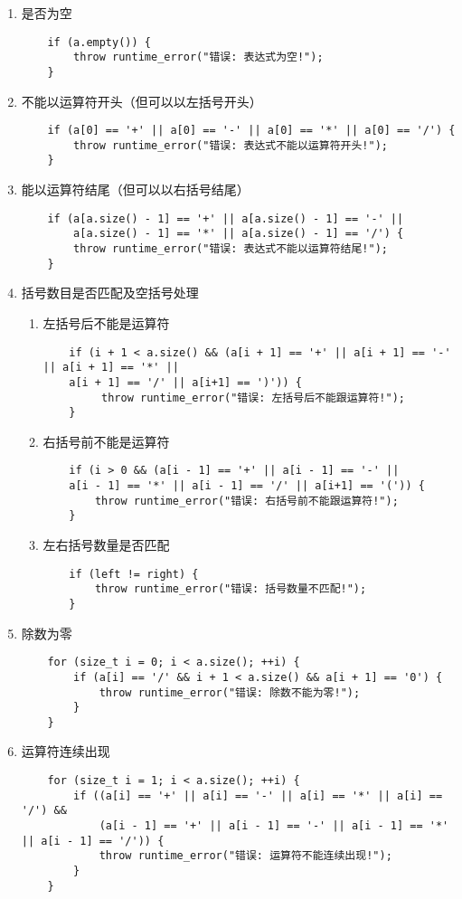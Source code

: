 \documentclass[a4paper]{article}
\begin{document}
\begin{enumerate}
    \item 是否为空
    \begin{lstlisting}
    if (a.empty()) {
        throw runtime_error("错误: 表达式为空!");
    }
    \end{lstlisting}
    \item 不能以运算符开头（但可以以左括号开头）
    \begin{lstlisting}
    if (a[0] == '+' || a[0] == '-' || a[0] == '*' || a[0] == '/') {
        throw runtime_error("错误: 表达式不能以运算符开头!");
    }
    \end{lstlisting}
    \item 能以运算符结尾（但可以以右括号结尾）
    \begin{lstlisting}
    if (a[a.size() - 1] == '+' || a[a.size() - 1] == '-' || 
        a[a.size() - 1] == '*' || a[a.size() - 1] == '/') {
        throw runtime_error("错误: 表达式不能以运算符结尾!");
    }

    \end{lstlisting}
    \item 括号数目是否匹配及空括号处理
    \begin{enumerate}
        \item 左括号后不能是运算符
        \begin{lstlisting}
    if (i + 1 < a.size() && (a[i + 1] == '+' || a[i + 1] == '-' || a[i + 1] == '*' || 
    a[i + 1] == '/' || a[i+1] == ')')) {
         throw runtime_error("错误: 左括号后不能跟运算符!");
    }
        \end{lstlisting}
        \item 右括号前不能是运算符
        \begin{lstlisting}
    if (i > 0 && (a[i - 1] == '+' || a[i - 1] == '-' || 
    a[i - 1] == '*' || a[i - 1] == '/' || a[i+1] == '(')) {
        throw runtime_error("错误: 右括号前不能跟运算符!");
    }
        \end{lstlisting}
        \item 左右括号数量是否匹配
        \begin{lstlisting}
    if (left != right) {
        throw runtime_error("错误: 括号数量不匹配!");
    }
        \end{lstlisting}    
    \end{enumerate}
    \item 除数为零
    \begin{lstlisting}
    for (size_t i = 0; i < a.size(); ++i) {
        if (a[i] == '/' && i + 1 < a.size() && a[i + 1] == '0') {
            throw runtime_error("错误: 除数不能为零!");
        }
    }
    \end{lstlisting}
    \item 运算符连续出现
    \begin{lstlisting}
    for (size_t i = 1; i < a.size(); ++i) {
        if ((a[i] == '+' || a[i] == '-' || a[i] == '*' || a[i] == '/') && 
            (a[i - 1] == '+' || a[i - 1] == '-' || a[i - 1] == '*' || a[i - 1] == '/')) {
            throw runtime_error("错误: 运算符不能连续出现!");
        }
    }
    \end{lstlisting} 
\end{enumerate} 
\end{document}
